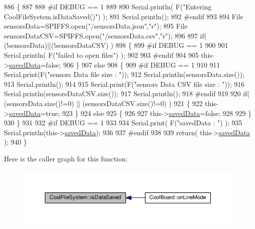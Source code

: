 \begin{DoxyCode}
886 \{
887 
888 \textcolor{preprocessor}{#if DEBUG == 1 }
889 
890     Serial.println( F(\textcolor{stringliteral}{"Entering CoolFileSystem.isDataSaved()"}) );
891     Serial.println();
892 \textcolor{preprocessor}{#endif}
893 
894     File sensorsData=SPIFFS.open(\textcolor{stringliteral}{"/sensorsData.json"},\textcolor{stringliteral}{"r"});
895     File sensorsDataCSV=SPIFFS.open(\textcolor{stringliteral}{"/sensorsData.csv"},\textcolor{stringliteral}{"r"});
896     
897     \textcolor{keywordflow}{if}( (!sensorsData)||(!sensorsDataCSV) ) 
898     \{
899 \textcolor{preprocessor}{    #if DEBUG == 1}
900 
901         Serial.println( F(\textcolor{stringliteral}{"failed to open files"}) );
902 
903 \textcolor{preprocessor}{    #endif}
904         
905         this->\hyperlink{classCoolFileSystem_ad398e0c5c41a0c88acdf5d672aa71351}{savedData}=\textcolor{keyword}{false};
906     \}
907     \textcolor{keywordflow}{else}
908     \{       
909 \textcolor{preprocessor}{        #if DEBUG == 1}
910 
911             Serial.print(F(\textcolor{stringliteral}{"sensors Data file size : "}));
912             Serial.println(sensorsData.size());
913             Serial.println();
914             
915             Serial.print(F(\textcolor{stringliteral}{"sensors Data CSV file size : "}));               
916             Serial.println(sensorsDataCSV.size());
917             Serial.println();
918 \textcolor{preprocessor}{        #endif  }
919 
920         \textcolor{keywordflow}{if}( (sensorsData.size()!=0) || (sensorsDataCSV.size()!=0) )
921         \{
922             this->\hyperlink{classCoolFileSystem_ad398e0c5c41a0c88acdf5d672aa71351}{savedData}=\textcolor{keyword}{true};
923         \}
924         \textcolor{keywordflow}{else}
925         \{
926 
927             this->\hyperlink{classCoolFileSystem_ad398e0c5c41a0c88acdf5d672aa71351}{savedData}=\textcolor{keyword}{false};     
928         
929         \}   
930     \}
931 
932 \textcolor{preprocessor}{#if DEBUG == 1 }
933 
934     Serial.print( F(\textcolor{stringliteral}{"savedData : "}) );
935     Serial.println(this->\hyperlink{classCoolFileSystem_ad398e0c5c41a0c88acdf5d672aa71351}{savedData});
936 
937 \textcolor{preprocessor}{#endif}
938 
939     \textcolor{keywordflow}{return}( this->\hyperlink{classCoolFileSystem_ad398e0c5c41a0c88acdf5d672aa71351}{savedData} );
940 \}
\end{DoxyCode}
Here is the caller graph for this function\+:\nopagebreak
\begin{figure}[H]
\begin{center}
\leavevmode
\includegraphics[width=350pt]{classCoolFileSystem_a5a7eaeea7a9fbf8aaef651d862fa3b5b_icgraph}
\end{center}
\end{figure}
